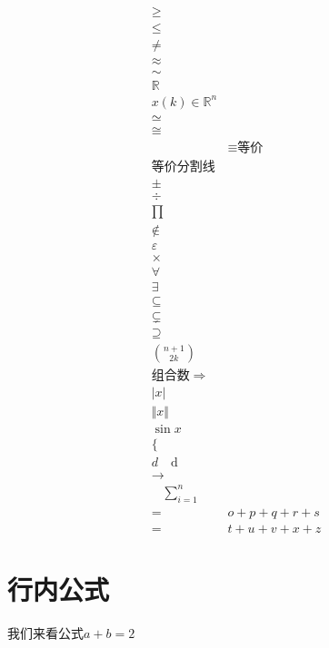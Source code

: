 \documentclass{article}
\begin{document}
    \[
    \begin{aligned}  %
        \geq \\ %
        \leq \\ %
        \neq \\ %
        \approx \\ %
        \sim \\ %
        \mathbb{R} \\ %
        x(k) \in \mathbb{R}^n  \\
        \simeq \\ 
        \cong \\ %
        &\equiv \text{等价} \\ 等价
        \text{分割线} \\
        \pm \\ %
        \div \\ %
        \prod \\ %
        \notin \\ %
        \varepsilon \\
        \times \\ %
        \forall \\ %
        \exists \\ %
        \subseteq \\ %
        \subsetneq \\
        \supseteq \\
        \binom{n+1}{2k} \\ 组合数
        \Rightarrow \\ 
        \vert x \vert \\ %
        \Vert x \Vert \\ %
        \sin x \\ %
        \{  \\  %
        d \quad \mathrm{d} \\ %
        \rightarrow \\ %
        \quad %
        \sum\limits_{i=1}^{n} \\ %
        =& o+p+q+r+s \\ 
        =& t+u+v+x+z 
        \end{aligned}
        \]




\section{行内公式} %
    我们来看公式$a+b=2$ %
\end{document}
